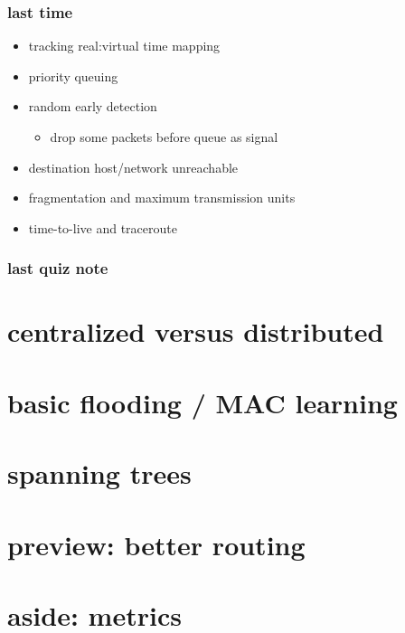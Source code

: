\date{}
\title{}
\date{}

\begin{frame}
    \titlepage
\end{frame}

\begin{frame}
\frametitle{last time}
\begin{itemize}
\item tracking real:virtual time mapping
\item priority queuing
\item random early detection
    \begin{itemize}
    \item drop some packets before queue as signal
    \end{itemize}
\item destination host/network unreachable
\item fragmentation and maximum transmission units
\item time-to-live and traceroute
\end{itemize}
\end{frame}

\begin{frame}
\frametitle{last quiz note}
\end{frame}

\section{centralized versus distributed}


\section{basic flooding / MAC learning}


\section{spanning trees}


\section{preview: better routing}


\section{aside: metrics}


